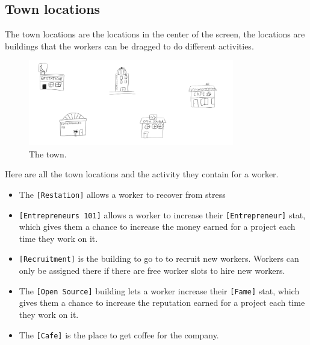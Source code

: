 \documentclass[11pt]{article}
\begin{document}
\subsection{Town locations}
The town locations are the locations in the center of the screen, the locations are buildings that the workers can be dragged to do different activities. 
\begin{figure}[H]
\centering
\includegraphics[width=0.8\textwidth, keepaspectratio]{imgs/town.png}
\caption{The town.}
\end{figure}
\noindent
Here are all the town locations and the activity they contain for a worker.
\begin{itemize}
\item The \texttt{[Restation]} allows a worker to recover from stress
\item \texttt{[Entrepreneurs 101]} allows a worker to increase their \texttt{[Entrepreneur]} stat, which gives them a chance to increase the money earned for a project each time they work on it.
\item \texttt{[Recruitment]} is the building to go to to recruit new workers. Workers can only be assigned there if there are free worker slots to hire new workers.
\item The \texttt{[Open Source]} building lets a worker increase their \texttt{[Fame]} stat, which gives them a chance to increase the reputation earned for a project each time they work on it.
\item The \texttt{[Cafe]} is the place to get coffee for the company.
\end{itemize}
\end{document}
